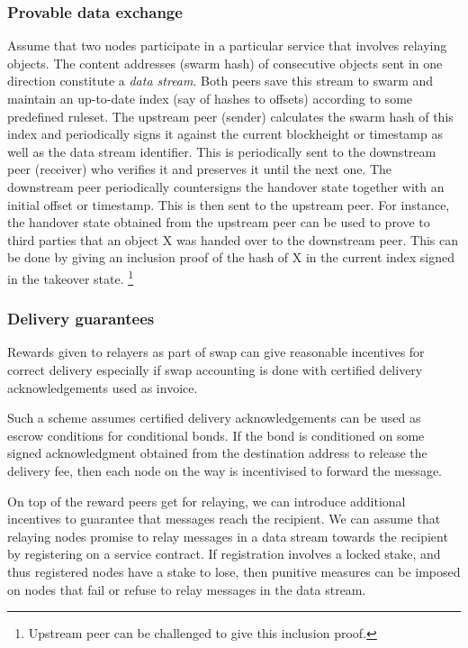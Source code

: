 \subsubsection{Provable data exchange} 

Assume that two nodes participate in a particular service that involves relaying objects. The content addresses (swarm hash) of consecutive objects sent in one direction constitute a \emph{data stream}. Both peers save this stream to swarm and maintain an up-to-date index (say of hashes to offsets) according to some predefined ruleset. The upstream peer (sender) calculates the swarm hash of this index and periodically signs it against the current blockheight or timestamp as well as the data stream identifier. This  is periodically sent to the downstream peer (receiver) who verifies it and preserves it until the next one. The downstream peer periodically countersigns the handover state together with an initial offset or timestamp. This  is then sent to the upstream peer. For instance, the handover state obtained from the upstream peer can be used to prove to third parties that an object X was handed over to the downstream peer. This can be done by giving an inclusion proof of the hash of X in the current index signed in the takeover state.%
%
\footnote{Upstream peer can be challenged to give this inclusion proof.}

\subsubsection{Delivery guarantees} 

Rewards given to relayers as part of swap can give reasonable incentives for correct delivery especially if swap accounting is done with certified delivery acknowledgements used as invoice. 

Such a scheme assumes certified delivery acknowledgements can be used as escrow conditions for conditional bonds. 
If the  bond is conditioned on some signed acknowledgment obtained from the destination address to release the delivery fee, then each node on the way is incentivised to forward the message. 


On top of the reward peers get for relaying, we can introduce additional incentives to guarantee that messages reach the recipient. We can assume that relaying nodes  promise to relay messages in a data stream towards the recipient by registering on a service contract. If registration involves a locked stake, and thus registered nodes have a stake to lose, then punitive measures can be imposed on nodes that fail or refuse to relay messages in the data stream.

